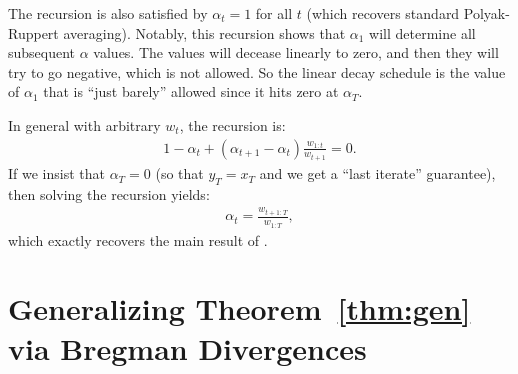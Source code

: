 \documentclass{article}
\begin{document}
The recursion  is also satisfied by $\alpha_t = 1$ for all $t$ (which recovers standard Polyak-Ruppert averaging). Notably, this recursion shows that $\alpha_1$ will determine all subsequent $\alpha$ values. The values will decease linearly to zero, and then they will try to go negative, which is not allowed. So the linear decay schedule is the value of $\alpha_1$ that is ``just barely'' allowed since it hits zero at $\alpha_T$.


In general with arbitrary $w_t$, the recursion is:
\begin{align*}
    1- \alpha_t + (\alpha_{t+1}-\alpha_t)\frac{w_{1:t}}{w_{t+1}}=0.
\end{align*}
If we insist that $\alpha_T=0$ (so that $y_T=x_T$ and we get a ``last iterate'' guarantee), then solving the recursion yields:
\begin{align*}
    \alpha_t = \frac{w_{t+1:T}}{w_{1:T}},
\end{align*}
which exactly recovers the main result of \cite{defazio2023when}. 
\section{Generalizing Theorem~\ref{thm:gen} via Bregman Divergences}\label{sec:bregman}
\end{document}
